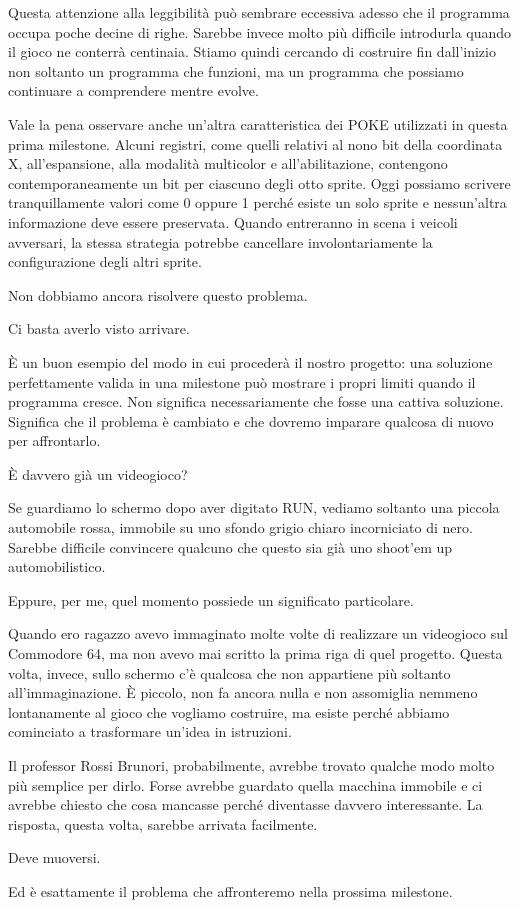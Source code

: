 \documentclass{article}
\begin{document}
Questa attenzione alla leggibilità può sembrare eccessiva adesso che il programma occupa poche decine di righe. Sarebbe
invece molto più difficile introdurla quando il gioco ne conterrà centinaia. Stiamo quindi cercando di costruire fin
dall'inizio non soltanto un programma che funzioni, ma un programma che possiamo continuare a comprendere mentre
evolve.

Vale la pena osservare anche un'altra caratteristica dei POKE utilizzati in questa prima milestone. Alcuni registri,
come quelli relativi al nono bit della coordinata X, all'espansione, alla modalità multicolor e all'abilitazione,
contengono contemporaneamente un bit per ciascuno degli otto sprite. Oggi possiamo scrivere tranquillamente valori come
0 oppure 1 perché esiste un solo sprite e nessun'altra informazione deve essere preservata. Quando entreranno in scena
i veicoli avversari, la stessa strategia potrebbe cancellare involontariamente la configurazione degli altri sprite.

Non dobbiamo ancora risolvere questo problema.

Ci basta averlo visto arrivare.

È un buon esempio del modo in cui procederà il nostro progetto: una soluzione perfettamente valida in una milestone può
mostrare i propri limiti quando il programma cresce. Non significa necessariamente che fosse una cattiva soluzione.
Significa che il problema è cambiato e che dovremo imparare qualcosa di nuovo per affrontarlo.

È davvero già un videogioco?

Se guardiamo lo schermo dopo aver digitato RUN, vediamo soltanto una piccola automobile rossa, immobile su uno sfondo
grigio chiaro incorniciato di nero. Sarebbe difficile convincere qualcuno che questo sia già uno shoot'em up
automobilistico.

Eppure, per me, quel momento possiede un significato particolare.

Quando ero ragazzo avevo immaginato molte volte di realizzare un videogioco sul Commodore 64, ma non avevo mai scritto
la prima riga di quel progetto. Questa volta, invece, sullo schermo c'è qualcosa che non appartiene più soltanto
all'immaginazione. È piccolo, non fa ancora nulla e non assomiglia nemmeno lontanamente al gioco che vogliamo
costruire, ma esiste perché abbiamo cominciato a trasformare un'idea in istruzioni.

Il professor Rossi Brunori, probabilmente, avrebbe trovato qualche modo molto più semplice per dirlo. Forse avrebbe
guardato quella macchina immobile e ci avrebbe chiesto che cosa mancasse perché diventasse davvero interessante. La
risposta, questa volta, sarebbe arrivata facilmente.

Deve muoversi.

Ed è esattamente il problema che affronteremo nella prossima milestone.


\bigskip
\end{document}
